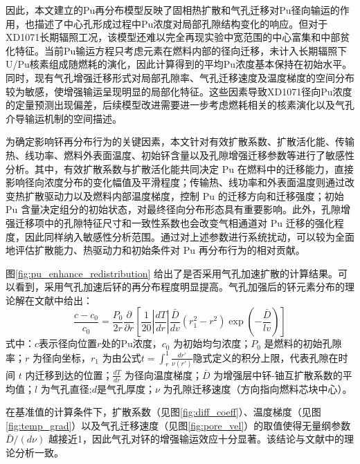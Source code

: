 因此，本文建立的Pu再分布模型反映了固相热扩散和气孔迁移对Pu径向输运的作用，也描述了中心孔形成过程中Pu浓度对局部孔隙结构变化的响应。但对于XD1071长期辐照工况，该模型还难以完全再现实验中宽范围的中心富集和中部贫化特征。当前Pu输运方程只考虑元素在燃料内部的径向迁移，未计入长期辐照下U/Pu核素组成随燃耗的演化，因此计算得到的平均Pu浓度基本保持在初始水平。同时，现有气孔增强迁移形式对局部孔隙率、气孔迁移速度及温度梯度的空间分布较为敏感，使增强输运呈现明显的局部化特征。这些因素导致XD1071径向Pu浓度的定量预测出现偏差，后续模型改进需要进一步考虑燃耗相关的核素演化以及气孔介导输运机制的空间描述。


为确定影响钚再分布行为的关键因素，本文针对有效扩散系数、扩散活化能、传输热、线功率、燃料外表面温度、初始钚含量以及孔隙增强迁移参数等进行了敏感性分析。其中，有效扩散系数与扩散活化能共同决定 Pu 在燃料中的迁移能力，直接影响径向浓度分布的变化幅值及平滑程度；传输热、线功率和外表面温度则通过改变热扩散驱动力以及燃料内部温度梯度，控制 Pu 的迁移方向和迁移强度；初始 Pu 含量决定组分的初始状态，对最终径向分布形态具有重要影响。此外，孔隙增强迁移项中的孔隙特征尺寸和一致性系数也会改变气相通道对 Pu 迁移的强化程度，因此同样纳入敏感性分析范围。通过对上述参数进行系统扰动，可以较为全面地评估扩散能力、热驱动力和初始条件对 Pu 再分布行为的相对贡献。

图\ref{fig:pu_enhance_redistribution} 给出了是否采用气孔加速扩散的计算结果。可以看到，采用气孔加速后钚的再分布程度明显提高。气孔加强后的钚元素分布的理论解在文献\cite{clementPlutoniumRedistributionMixed1978}中给出：
\begin{equation}
	\frac{c - c_0}{c_0} = \frac{P_0}{2r} \frac{\partial}{\partial r} \left[ \frac{1}{20} \left| \frac{dT}{dr} \right| \frac{\bar{D}}{dv} (r_1^2 - r^2) \exp\left(-\frac{\bar{D}}{lv}\right) \right]
\end{equation}
式中：\(c\)表示径向位置\(r\)处的Pu浓度，\(c_0\) 为初始均匀浓度；\(P_0\) 是燃料的初始孔隙率；\(r\) 为径向坐标，\(r_1\) 为由公式$t = \int_r^1 \frac{dr'}{\nu(r')}$隐式定义的积分上限，代表孔隙在时间 \(t\) 内迁移到达的位置；\(\frac{dT}{dr}\) 为径向温度梯度；\(\bar{D}\) 为增强层中钚-铀互扩散系数的平均值；\(l\) 为气孔直径;\(d\)是气孔厚度；\(\nu\) 为孔隙迁移速度（方向指向燃料芯块中心）。

在基准值的计算条件下，扩散系数（见图\ref{fig:diff_coeff}）、温度梯度（见图\ref{fig:temp_grad}）以及气孔迁移速度（见图\ref{fig:pore_vel}）的取值使得无量纲参数 \(\bar{D}/(d \nu)\) 越接近1，因此气孔对钚的增强输运效应十分显著。该结论与文献\cite{clementPlutoniumRedistributionMixed1978}中的理论分析一致。

